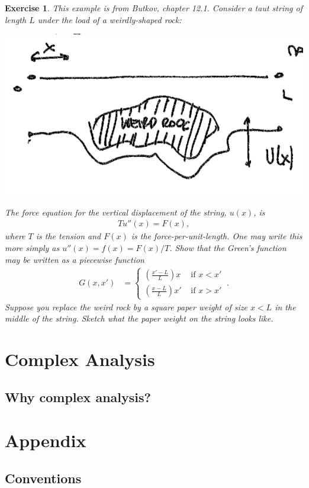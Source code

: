 \documentclass[
  11pt,
	colorful,
	raggedright,
]{tufte-style-thesis-flip}
\newtheorem{exercise}{Exercise}[section]
\begin{document}
\begin{exercise}
This example is from Butkov, chapter 12.1. Consider a taut string of length $L$ under the load of a weirdly-shaped rock:
\begin{center}
\includegraphics[width=.5\textwidth]{figures/lec12_eg.png}
\end{center}
The force equation for the vertical displacement of the string, $u(x)$, is
\begin{align}
  T u''(x) = F(x),
\end{align}
where $T$ is the tension and $F(x)$ is the force-per-unit-length. One may write this more simply as $u''(x) = f(x) = F(x)/T$. Show that the Green's function may be written as a piecewise function
\begin{align}
  G(x,x') &=
  \begin{cases}
  \left(\frac{x'-L}{L}\right)x  & \text{ if } x<x'
  \\
  \left(\frac{x-L}{L}\right)x' & \text{ if } x>x' 
  \end{cases}\ .
\end{align}
Suppose you replace the weird rock by a square paper weight of size $x < L$ in the middle of the string. Sketch what the paper weight on the string looks like.
\end{exercise}



\part{Complex Analysis}

\chapter{Why complex analysis?}


\part*{Appendix}
\appendix

\chapter{Conventions}
\end{document}
